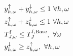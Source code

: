 \documentclass[11pt,a4paper]{article}
\begin{document}
\begin{subequations}
\begin{align}
        \  & y_{h,\omega}^{\uparrow} + y_{h,\omega}^{\downarrow} \leq 1 \                                                           \forall{h,\omega}                                                                                                                                                                     \label{aux:6}                                                                                                                                                                                                                           \\
        \  & z_{h,\omega}^{\uparrow} + z_{h,\omega}^{\downarrow} \leq 1 \                                                           \forall{h,\omega} \label{aux:7}                                                                                                                                                                                                                                                                                                                                                                                               \\
        \  & T^{\rm{f}}_{J,\omega} \leq T^{\rm{f}, \rm{Base}}_{J}, \ \forall{\omega} \label{temp:1}                                                                                                                                                                                                                                                                                                                                                                                                                                                               \\
        \  & y^{\downarrow}_{h, \omega} \geq z^{\uparrow}_{h, \omega}, \                                                                                                                                                                                                                                                                 \forall{h, \omega} \label{rebound:1}                                                                                                                                                                                     \\

\end{align}
\end{subequations}
\end{document}
